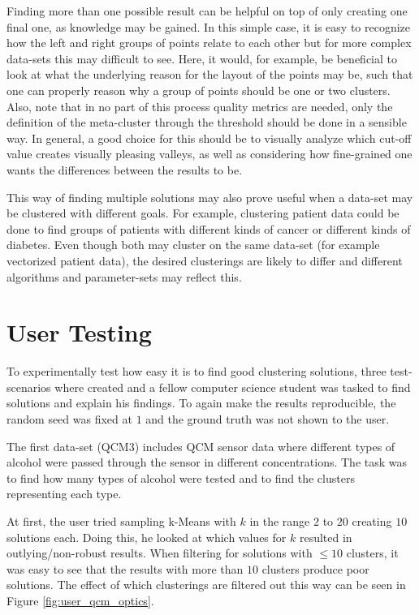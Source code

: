 \documentclass[
	a4paper,
	english,
	twoside,
	openright,               
	11pt                            
	]{report}
\begin{document}
Finding more than one possible result can be helpful on top of only creating one final one, as knowledge may be gained. In this simple case, it is easy to recognize how the left and right groups of points relate to each other but for more complex data-sets this may difficult to see. Here, it would, for example, be beneficial to look at what the underlying reason for the layout of the points may be, such that one can properly reason why a group of points should be one or two clusters. Also, note that in no part of this process quality metrics are needed, only the definition of the meta-cluster through the threshold should be done in a sensible way. In general, a good choice for this should be to visually analyze which cut-off value creates visually pleasing valleys, as well as considering how fine-grained one wants the differences between the results to be.

This way of finding multiple solutions may also prove useful when a data-set may be clustered with different goals. For example, clustering patient data could be done to find groups of patients with different kinds of cancer or different kinds of diabetes. Even though both may cluster on the same data-set (for example vectorized patient data), the desired clusterings are likely to differ and different algorithms and parameter-sets may reflect this.

\section{User Testing}\label{sec:user_test}
To experimentally test how easy it is to find good clustering solutions, three test-scenarios where created and a fellow computer science student was tasked to find solutions and explain his findings. To again make the results reproducible, the random seed was fixed at $1$ and the ground truth was not shown to the user.

The first data-set (QCM3) \cite{qcm} includes QCM sensor data where different types of alcohol were passed through the sensor in different concentrations. The task was to find how many types of alcohol were tested and to find the clusters representing each type.

At first, the user tried sampling k-Means with $k$ in the range $2$ to $20$ creating $10$ solutions each. Doing this, he looked at which values for $k$ resulted in outlying/non-robust results. When filtering for solutions with $\leq10$ clusters, it was easy to see that the results with more than $10$ clusters produce poor solutions. The effect of which clusterings are filtered out this way can be seen in Figure \ref{fig:user_qcm_optics}.
\end{document}
